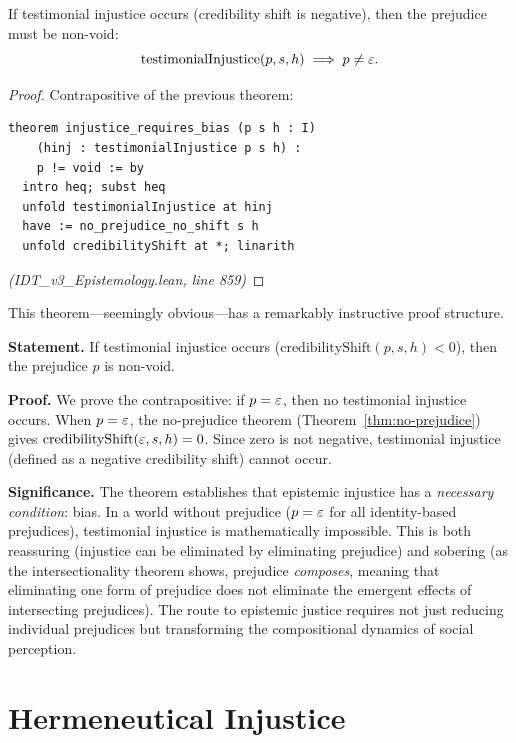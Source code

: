 \begin{theorem}
\label{thm:injustice-requires-bias}
If testimonial injustice occurs (credibility shift is negative), then the
prejudice must be non-void:
\[
  \mathrm{testimonialInjustice}(p, s, h) \implies p \neq \varepsilon.
\]
\end{theorem}

\begin{proof}
Contrapositive of the previous theorem:
\begin{lstlisting}
theorem injustice_requires_bias (p s h : I)
    (hinj : testimonialInjustice p s h) :
    p != void := by
  intro heq; subst heq
  unfold testimonialInjustice at hinj
  have := no_prejudice_no_shift s h
  unfold credibilityShift at *; linarith
\end{lstlisting}
\textit{(IDT\_v3\_Epistemology.lean, line 859)}
\end{proof}

\begin{remark}
This theorem---seemingly obvious---has a remarkably instructive proof structure.

\textbf{Statement.} If testimonial injustice occurs ($\mathrm{credibilityShift}(p, s, h) < 0$),
then the prejudice $p$ is non-void.

\textbf{Proof.} We prove the contrapositive: if $p = \varepsilon$, then no
testimonial injustice occurs. When $p = \varepsilon$, the no-prejudice theorem
(Theorem~\ref{thm:no-prejudice}) gives $\mathrm{credibilityShift}(\varepsilon, s, h) = 0$.
Since zero is not negative, testimonial injustice (defined as a negative
credibility shift) cannot occur.

\textbf{Significance.} The theorem establishes that epistemic injustice has a
\emph{necessary condition}: bias. In a world without prejudice ($p = \varepsilon$
for all identity-based prejudices), testimonial injustice is mathematically
impossible. This is both reassuring (injustice can be eliminated by eliminating
prejudice) and sobering (as the intersectionality theorem shows, prejudice
\emph{composes}, meaning that eliminating one form of prejudice does not
eliminate the emergent effects of intersecting prejudices). The route to
epistemic justice requires not just reducing individual prejudices but
transforming the compositional dynamics of social perception.
\end{remark}

\section{Hermeneutical Injustice}

